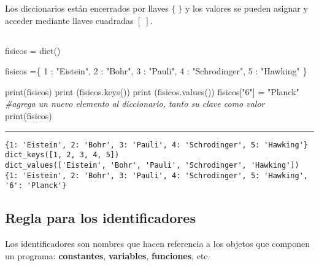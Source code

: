 \documentclass[]{article}
\newenvironment{Shaded}{}{}
\newcommand{\DecValTok}[1]{\textcolor[rgb]{0.25,0.63,0.44}{#1}}
\newcommand{\StringTok}[1]{\textcolor[rgb]{0.25,0.44,0.63}{#1}}
\newcommand{\CommentTok}[1]{\textcolor[rgb]{0.38,0.63,0.69}{\textit{#1}}}
\newcommand{\OperatorTok}[1]{\textcolor[rgb]{0.40,0.40,0.40}{#1}}
\newcommand{\BuiltInTok}[1]{#1}
\newcommand{\NormalTok}[1]{#1}
\begin{document}
Los diccionarios están encerrados por llaves \(\{ \; \}\) y los valores
se pueden asignar y acceder mediante llaves cuadradas \([ \; ]\).

\subsection{}\label{section-40}

\begin{Shaded}
\begin{Highlighting}[]
\NormalTok{fisicos }\OperatorTok{=} \BuiltInTok{dict}\NormalTok{()}

\NormalTok{fisicos }\OperatorTok{=}\NormalTok{\{}
    \DecValTok{1}\NormalTok{ : }\StringTok{"Eistein"}\NormalTok{,}
    \DecValTok{2}\NormalTok{ : }\StringTok{"Bohr"}\NormalTok{,}
    \DecValTok{3}\NormalTok{ : }\StringTok{"Pauli"}\NormalTok{,}
    \DecValTok{4}\NormalTok{ : }\StringTok{"Schrodinger"}\NormalTok{,}
    \DecValTok{5}\NormalTok{ : }\StringTok{"Hawking"}
\NormalTok{\}}

\BuiltInTok{print}\NormalTok{(fisicos)}
\BuiltInTok{print}\NormalTok{ (fisicos.keys())}
\BuiltInTok{print}\NormalTok{ (fisicos.values())}
\NormalTok{fisicos[}\StringTok{"6"}\NormalTok{] }\OperatorTok{=} \StringTok{"Planck"}    \CommentTok{#agrega un nuevo elemento al diccionario, tanto su clave como valor}
\BuiltInTok{print}\NormalTok{(fisicos)}
\end{Highlighting}
\end{Shaded}

\begin{center}\rule{0.5\linewidth}{\linethickness}\end{center}

\begin{verbatim}
{1: 'Eistein', 2: 'Bohr', 3: 'Pauli', 4: 'Schrodinger', 5: 'Hawking'}
dict_keys([1, 2, 3, 4, 5])
dict_values(['Eistein', 'Bohr', 'Pauli', 'Schrodinger', 'Hawking'])
{1: 'Eistein', 2: 'Bohr', 3: 'Pauli', 4: 'Schrodinger', 5: 'Hawking', '6': 'Planck'}
\end{verbatim}

\subsection{Regla para los
identificadores}\label{regla-para-los-identificadores}

Los identificadores son nombres que hacen referencia a los objetos que
componen un programa: \textbf{constantes}, \textbf{variables},
\textbf{funciones}, etc.
\end{document}
